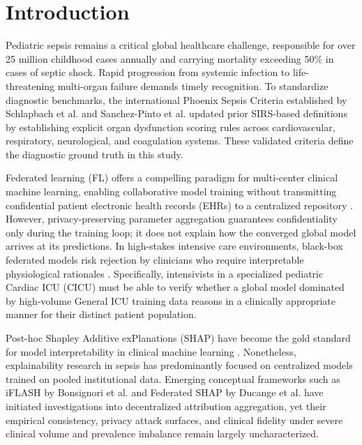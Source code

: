 \documentclass[runningheads]{llncs}
\begin{document}
\section{Introduction}\label{sec:intro}

Pediatric sepsis remains a critical global healthcare challenge, responsible for over 25 million childhood cases annually and carrying mortality exceeding 50\% in cases of septic shock. Rapid progression from systemic infection to life-threatening multi-organ failure demands timely recognition. To standardize diagnostic benchmarks, the international Phoenix Sepsis Criteria established by Schlapbach et al. \cite{schlapbach2024phoenix} and Sanchez-Pinto et al. \cite{sanchezpinto2024phoenix} updated prior SIRS-based definitions \cite{goldstein2005sirs} by establishing explicit organ dysfunction scoring rules across cardiovascular, respiratory, neurological, and coagulation systems. These validated criteria define the diagnostic ground truth in this study.

Federated learning (FL) offers a compelling paradigm for multi-center clinical machine learning, enabling collaborative model training without transmitting confidential patient electronic health records (EHRs) to a centralized repository \cite{mcmahan2017fedavg,li2020fedprox}. However, privacy-preserving parameter aggregation guarantees confidentiality only during the training loop; it does not explain how the converged global model arrives at its predictions. In high-stakes intensive care environments, black-box federated models risk rejection by clinicians who require interpretable physiological rationales \cite{athukorala2026explainable}. Specifically, intensivists in a specialized pediatric Cardiac ICU (CICU) must be able to verify whether a global model dominated by high-volume General ICU training data reasons in a clinically appropriate manner for their distinct patient population.

Post-hoc Shapley Additive exPlanations (SHAP) \cite{lundberg2017shap} have become the gold standard for model interpretability in clinical machine learning \cite{athukorala2026explainable,chanci2025machine}. Nonetheless, explainability research in sepsis has predominantly focused on centralized models trained on pooled institutional data. Emerging conceptual frameworks such as iFLASH by Bonsignori et al. \cite{bonsignori2026interpreting} and Federated SHAP by Ducange et al. \cite{ducange2026federated} have initiated investigations into decentralized attribution aggregation, yet their empirical consistency, privacy attack surfaces, and clinical fidelity under severe clinical volume and prevalence imbalance remain largely uncharacterized.
\end{document}
